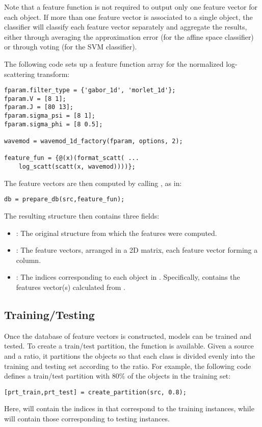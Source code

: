 \documentclass[twocolumn]{article}
\begin{document}
Note that a feature function is not required to output only one feature vector for each object. If more than one feature vector is associated to a single object, the classifier will classify each feature vector separately and aggregate the results, either through averaging the approximation error (for the affine space classifier) or through voting (for the SVM classifier).

The following code sets up a feature function array for the normalized log-scattering transform:
\begin{lstlisting}
fparam.filter_type = {'gabor_1d', 'morlet_1d'};
fparam.V = [8 1];
fparam.J = [80 13];
fparam.sigma_psi = [8 1];
fparam.sigma_phi = [8 0.5];

wavemod = wavemod_1d_factory(fparam, options, 2);

feature_fun = {@(x)(format_scatt( ...
	log_scatt(scatt(x, wavemod))))};
\end{lstlisting}

The feature vectors are then computed by calling , as in:
\begin{lstlisting}
db = prepare_db(src,feature_fun);
\end{lstlisting}
The resulting  structure then contains three fields:
\begin{itemize}
	\item {}: The original  structure from which the features were computed.
	\item {}: The feature vectors, arranged in a 2D matrix, each feature vector forming a column.
	\item {}: The indices corresponding to each object in . Specifically,  contains the features vector(s) calculated from .
\end{itemize}

\subsection{Training/Testing}

Once the database of feature vectors is constructed, models can be trained and tested. To create a train/test partition, the function  is available. Given a source  and a ratio, it partitions the objects so that each class is divided evenly into the training and testing set according to the ratio. For example, the following code defines a train/test partition with $80\%$ of the objects in the training set:
\begin{lstlisting}
[prt_train,prt_test] = create_partition(src, 0.8);
\end{lstlisting}
Here,  will contain the indices in  that correspond to the training instances, while  will contain those corresponding to testing instances.
\end{document}
